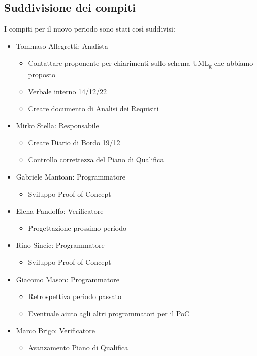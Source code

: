 \subsection{Suddivisione dei compiti}
I compiti per il nuovo periodo sono stati così suddivisi:
\begin{itemize}
	\item Tommaso Allegretti: Analista
	\begin{itemize}
		\item Contattare proponente per chiarimenti sullo schema UML\textsubscript{g} che abbiamo proposto
		\item Verbale interno 14/12/22
		\item Creare documento di Analisi dei Requisiti
	\end{itemize}
	
	\item Mirko Stella: Responsabile
	\begin{itemize}
		\item Creare Diario di Bordo 19/12
		\item Controllo correttezza del Piano di Qualifica
	\end{itemize}
	
	\item Gabriele Mantoan: Programmatore
	\begin{itemize}
		\item Sviluppo Proof of Concept
	\end{itemize}
	
	\item Elena Pandolfo: Verificatore
	\begin{itemize}
		\item Progettazione prossimo periodo
	\end{itemize}
	
	\item Rino Sincic: Programmatore
	\begin{itemize}
		\item Sviluppo Proof of Concept
	\end{itemize}
	
	\item Giacomo Mason: Programmatore
	\begin{itemize}
		\item Retrospettiva periodo passato
		\item Eventuale aiuto agli altri programmatori per il PoC
	\end{itemize}
	\item Marco Brigo: Verificatore
	\begin{itemize}
		\item Avanzamento Piano di Qualifica
	\end{itemize}
\end{itemize}

